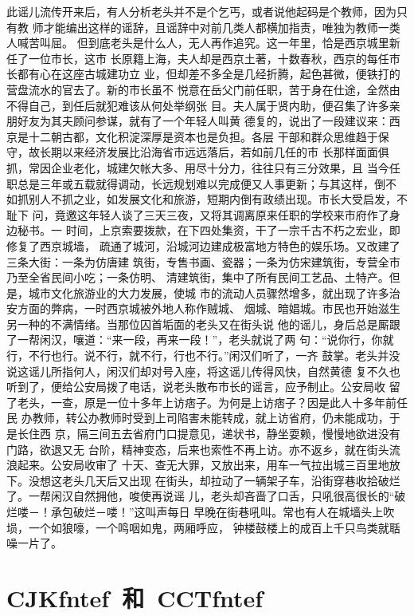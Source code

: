 \documentclass[cs4size,a4paper,fancyhdr,fntef,UTF8]{ctexbook}
\begin{document}
此谣儿流传开来后，有人分析老头并不是个乞丐，或者说他起码是个教师，因为只有教
师才能编出这样的谣辞，且谣辞中对前几类人都横加指责，唯独为教师一类人喊苦叫屈。
但到底老头是什么人，无人再作追究。这一年里，恰是西京城里新任了一位市长，这市
长原籍上海，夫人却是西京土著，十数春秋，西京的每任市长都有心在这座古城建功立
业，但却差不多全是几经折腾，起色甚微，便铁打的营盘流水的官去了。新的市长虽不
悦意在岳父门前任职，苦于身在仕途，全然由不得自己，到任后就犯难该从何处举纲张
目。夫人属于贤内助，便召集了许多亲朋好友为其夫顾问参谋，就有了一个年轻人叫黄
德复的，说出了一段建议来：西京是十二朝古都，文化积淀深厚是资本也是负担。各层
干部和群众思维趋于保守，故长期以来经济发展比沿海省市远远落后，若如前几任的市
长那样面面俱抓，常因企业老化，城建欠帐大多、用尽十分力，往往只有三分效果，且
当今任职总是三年或五载就得调动，长远规划难以完成便又人事更新；与其这样，倒不
如抓别人不抓之业，如发展文化和旅游，短期内倒有政绩出现。市长大受启发，不耻下
问，竟邀这年轻人谈了三天三夜，又将其调离原来任职的学校来市府作了身边秘书。一
时间，上京索要拨款，在下四处集资，干了一宗千古不朽之宏业，即修复了西京城墙，
疏通了城河，沿城河边建成极富地方特色的娱乐场。又改建了三条大街：一条为仿唐建
筑街，专售书画、瓷器；一条为仿宋建筑街，专营全市乃至全省民间小吃；一条仿明、
清建筑街，集中了所有民间工艺品、土特产。但是，城市文化旅游业的大力发展，使城
市的流动人员骤然增多，就出现了许多治安方面的弊病，一时西京城被外地人称作贼城、
烟城、暗娼城。市民也开始滋生另一种的不满情绪。当那位囚首垢面的老头又在街头说
他的谣儿，身后总是厮跟了一帮闲汉，嚷道：“来一段，再来一段！”，老头就说了两
句：“说你行，你就行，不行也行。说不行，就不行，行也不行。”闲汉们听了，一齐
鼓掌。老头并没说这谣儿所指何人，闲汉们却对号入座，将这谣儿传得风快，自然黄德
复不久也听到了，便给公安局拨了电话，说老头散布市长的谣言，应予制止。公安局收
留了老头，一查，原是一位十多年上访痞子。为何是上访痞子？因是此人十多年前任民
办教师，转公办教师时受到上司陷害未能转成，就上访省府，仍未能成功，于是长住西
京，隔三间五去省府门口提意见，递状书，静坐耍赖，慢慢地欲进没有门路，欲退又无
台阶，精神变态，后来也索性不再上访。亦不返乡，就在街头流浪起来。公安局收审了
十天、查无大罪，又放出来，用车一气拉出城三百里地放下。没想这老头几天后又出现
在街头，却拉动了一辆架子车，沿街穿巷收拾破烂了。一帮闲汉自然拥他，唆使再说谣
儿，老头却吝啬了口舌，只吼很高很长的“破烂喽－！承包破烂－喽！”这叫声每日
早晚在街巷吼叫。常也有人在城墙头上吹埙，一个如狼嚎，一个鸣咽如鬼，两厢呼应，
钟楼鼓楼上的成百上千只鸟类就聒噪一片了。


\chapter{CJKfntef~和~CCTfntef}
\end{document}
